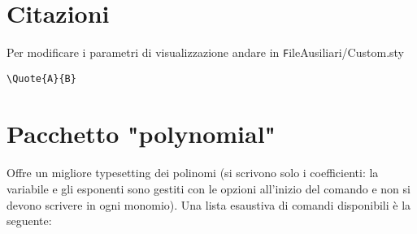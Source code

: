\section{Citazioni}
Per modificare i parametri di visualizzazione andare in {\texttt FileAusiliari/Custom.sty}
\begin{verbatim}
\Quote{A}{B}
\end{verbatim}
\section{Pacchetto "polynomial"}
\paragraph*{}Offre un migliore typesetting dei polinomi (si scrivono solo i coefficienti: la variabile e gli esponenti sono gestiti con le opzioni all'inizio del comando e non si devono scrivere in ogni monomio). Una lista esaustiva di comandi disponibili è la seguente:
